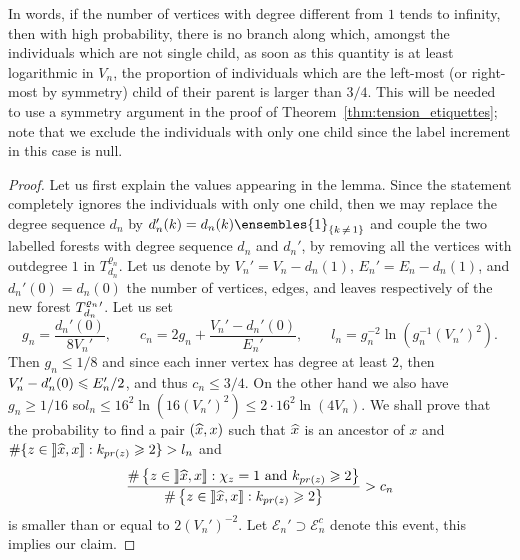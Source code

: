 \documentclass[10pt]{amsart}
\theoremstyle{definition}\newtheorem{defi}[theo]{Definition}\newtheorem{rema}[theo]{Remark}\newtheorem{exam}[theo]{Example}\newtheorem{exem}[theo]{Example}\newtheorem{nota}[theo]{Notation}
\newcommand{\rrbracket}{\mathclose{]\mkern -2.7mu]}}
\newcommand{\1}{\ensembles{1}}
\newcommand{\ind}[1]{\1_{\{#1\}}}
\renewcommand{\le}{\leqslant}
\renewcommand{\ge}{\geqslant}
\newcommand{\clE}{\mathcal{E}}
\newcommand{\fn}{T_{d_n}^{\varrho_n}}
\newcommand{\edges}{E}
\newcommand{\vertices}{V}
\let\oldhat\hat
\renewcommand*{\hat}[1]{\mathchoice{\widehat{#1}}{\widehat{#1}}{\oldhat{#1}}{\oldhat{#1}}}
\providecommand{\?}{}
\begin{document}
In words, if the number of vertices with degree different from $1$ tends to infinity, then with high probability, there is no branch along which, amongst the individuals which are not single child, as soon as this quantity is at least logarithmic in $\vertices_{n}$, the proportion of individuals which are the left-most (or right-most by symmetry) child of their parent is larger than $3/4$. This will be needed to use a symmetry argument in the proof of Theorem~\ref{thm:tension_etiquettes}; note that we exclude the individuals with only one child since the label increment in this case is null.


\begin{proof}
Let us first explain the values appearing in the lemma. Since the statement completely ignores the individuals with only one child, then we may replace the degree sequence $d_n$ by $d_n'(k) = d_n(k) \ind{k\,\ne\,1}$ and couple the two labelled forests with degree sequence $d_n$ and $d_n'$, by removing all the vertices with outdegree $1$ in $\fn$. Let us denote by $\vertices_{n}' = \vertices_{n}-d_{n}(1)$, $\edges_{n}' = \edges_{n}-d_{n}(1)$, and $d_{n}'(0) = d_{n}(0)$ the number of vertices, edges, and leaves respectively of the new forest ${\fn}\vphantom{T}'$. Let us set
\[
g_n = \frac{d_{n}'(0)}{8 \vertices_{n}'},
\qquad c_n = 2g_n + \frac{\vertices_n'-d_{n}'(0)}{\edges_n'},
\qquad l_n = g_n^{-2} \ln\left(g_n^{-1} \left(\vertices_n'\right)^2\right).
\]
Then $g_{n} \le 1/8$ and since each inner vertex has degree at least $2$, then $\vertices_n'-d_{n}'(0)\linebreak\le \edges_n'/2$, and thus $c_{n} \le 3/4$. On the other hand we also have $g_{n} \ge 1/16$ so\linebreak$l_{n} \le 16^{2} \ln(16 (\vertices_n')^2) \le 2\cdot16^{2} \ln(4 \vertices_{n})$. We shall prove that the probability to find a pair $(\hat{x}, x)$ such that $\hat{x}$ is an ancestor of $x$ and $\#\{z \in \mathopen{\rrbracket} \hat{x}, x\rrbracket : k_{pr(z)} \ge 2\} > l_{n}$ and
\[
\frac{\#\left\{z \in \mathopen{\rrbracket} \hat{x}, x\rrbracket : \chi_z = 1 \text{ and } k_{pr(z)} \ge 2\right\}}{\#\left\{z \in \mathopen{\rrbracket} \hat{x}, x\rrbracket : k_{pr(z)} \ge 2\right\}} > c_{n}
\]
is smaller than or equal to $2 (\vertices_n')^{- 2}$. Let $\clE_{n}' \supset \clE_{n}^{c}$ denote this event, this implies our claim.



\end{proof}
\end{document}
